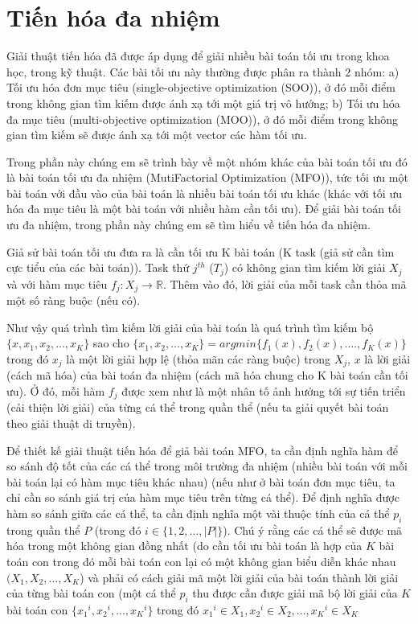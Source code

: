 \documentclass[a4paper,12pt]{report}
\begin{document}
\section{Tiến hóa đa nhiệm}\label{sec_mfo}
Giải thuật tiến hóa đã được áp dụng để giải nhiều bài toán tối ưu trong khoa học, trong kỹ thuật. Các bài tối ưu này thường được phân ra thành 2 nhóm: a) Tối ưu hóa đơn mục tiêu (single-objective optimization (SOO)), ở đó mỗi điểm trong không gian tìm kiếm được ánh xạ tới một giá trị vô hướng; b) Tối ưu hóa đa mục tiêu (multi-objective optimization (MOO)), ở đó mỗi điểm trong không gian tìm kiếm sẽ được ánh xạ tới một vector các hàm tối ưu. 
\par Trong phần này chúng em sẽ trình bày về một nhóm khác của bài toán tối ưu đó là bài toán tối ưu đa nhiệm (MutiFactorial Optimization (MFO)), tức tối ưu một bài toán với đầu vào của bài toán là nhiều bài toán tối ưu khác (khác với tối ưu hóa đa mục tiêu là một bài toán với nhiều hàm cần tối ưu). Để giải bài toán tối ưu đa nhiệm, trong phần này chúng em sẽ tìm hiểu về tiến hóa đa nhiệm.
\par Giả sử bài toán tối ưu đưa ra là cần tối ưu K bài toán (K task (giả sử cần tìm cực tiểu của các bài toán)). Task thứ $j^{th}$ ($T_j$) có không gian tìm kiếm lời giải $X_j$ và với hàm mục tiêu $f_j: X_j \rightarrow \mathbb{R}$. Thêm vào đó, lời giải của mỗi task cần thỏa mã một số ràng buộc (nếu có).
\par Như vậy quá trình tìm kiếm lời giải của bài toán là quá trình tìm kiếm bộ $\{x, x_1, x_2 ,..., x_K\}$ sao cho $\{x_1, x_2, ..., x_K\} = argmin \{f_1(x), f_2(x), ...., f_K(x)\}$ trong đó $x_j$ là một lời giải hợp lệ (thỏa mãn các ràng buộc) trong $X_j$, $x$ là lời giải (cách mã hóa) của bài toán đa nhiệm (cách mã hóa chung cho K bài toán cần tối ưu). Ở đó, mỗi hàm $f_j$ được xem như là một nhân tố ảnh hưởng tới sự tiến triển (cải thiện lời giải) của từng cá thể trong quần thể (nếu ta giải quyết bài toán theo giải thuật di truyền).
\par Để thiết kế giải thuật tiến hóa để giả bài toán MFO, ta cần định nghĩa hàm để so sánh độ tốt của các cá thể trong môi trường đa nhiệm (nhiều bài toán với mỗi bài toán lại có hàm mục tiêu khác nhau) (nếu như ở bài toán đơn mục tiêu, ta chỉ cần so sánh giá trị của hàm mục tiêu trên từng cá thể). Để định nghĩa được hàm so sánh giữa các cá thể, ta cần định nghĩa một vài thuộc tính của cá thể $p_i$ trong quần thể $P$ (trong đó $i \in \{1, 2, ..., |P|\}$). Chú ý rằng các cá thể sẽ được mã hóa trong một không gian đồng nhất (do cần tối ưu bài toán là hợp của $K$ bài toán con trong đó mỗi bài toán con lại có một không gian biểu diễn khác nhau $(X_1, X_2, ..., X_K$) và phải có cách giải mã một lời giải của bài toán thành lời giải của từng bài toán con (một cá thể $p_i$ thu được cần được giải mã bộ lời giải của $K$ bài toán con $\{{x_1}^i, {x_2}^i, ..., {x_K}^i\}$ trong đó ${x_1}^i \in X_1, {x_2}^i \in X_2, ..., {x_K}^i \in X_K$
\end{document}
